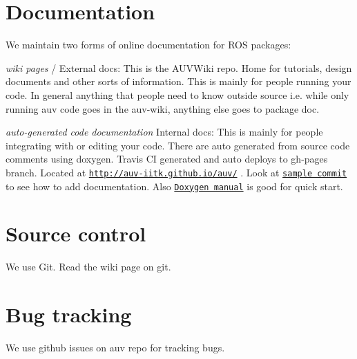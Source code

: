 \hypertarget{md_coding_docs_coding_guidelines_autotoc_md1}{}\section{Documentation}\label{md_coding_docs_coding_guidelines_autotoc_md1}
We maintain two forms of online documentation for R\+OS packages\+:
\begin{DoxyItemize}
\item {\itshape wiki pages} / External docs\+: This is the A\+U\+V\+Wiki repo. Home for tutorials, design documents and other sorts of information. This is mainly for people running your code. In general anything that people need to know outside source i.\+e. while only running auv code goes in the auv-\/wiki, anything else goes to package doc.
\item {\itshape auto-\/generated code documentation} Internal docs\+: This is mainly for people integrating with or editing your code. There are auto generated from source code comments using doxygen. Travis CI generated and auto deploys to gh-\/pages branch. Located at \href{http://auv-iitk.github.io/auv/}{\tt http\+://auv-\/iitk.\+github.\+io/auv/} . Look at \href{https://github.com/AUV-IITK/auv/pull/103/commits/c23d7efdadbfd611276e20509f98e6b39328fa20}{\tt sample commit} to see how to add documentation. Also \href{https://www.stack.nl/~dimitri/doxygen/manual/docblocks.html}{\tt Doxygen manual} is good for quick start.
\end{DoxyItemize}



\hypertarget{md_coding_docs_coding_guidelines_autotoc_md2}{}\section{Source control}\label{md_coding_docs_coding_guidelines_autotoc_md2}
We use Git. Read the wiki page on git.



\hypertarget{md_coding_docs_coding_guidelines_autotoc_md3}{}\section{Bug tracking}\label{md_coding_docs_coding_guidelines_autotoc_md3}
We use github issues on auv repo for tracking bugs.



